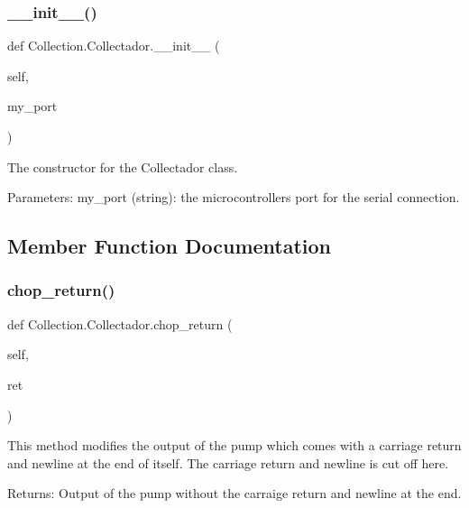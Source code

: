 \subsubsection{\texorpdfstring{\_\_init\_\_()}{\_\_init\_\_()}}
{\footnotesize\ttfamily def Collection.\+Collectador.\+\_\+\+\_\+init\+\_\+\+\_\+ (\begin{DoxyParamCaption}\item[{}]{self,  }\item[{}]{my\+\_\+port }\end{DoxyParamCaption})}

\begin{DoxyVerb}The constructor for the Collectador class.

Parameters:
    my_port (string): the microcontrollers port for the serial connection.
\end{DoxyVerb}
 

\subsection{Member Function Documentation}
\mbox{\label{class_collection_1_1_collectador_a1fcc60319735e3e18d938c84073aef20}} 
\subsubsection{\texorpdfstring{chop\_return()}{chop\_return()}}
{\footnotesize\ttfamily def Collection.\+Collectador.\+chop\+\_\+return (\begin{DoxyParamCaption}\item[{}]{self,  }\item[{}]{ret }\end{DoxyParamCaption})}

\begin{DoxyVerb}This method modifies the output of the pump which comes with a carriage return and newline at the end of itself.
The carriage return and newline is cut off here.

Returns:
    Output of the pump without the carraige return and newline at the end.
\end{DoxyVerb}
 \mbox{\label{class_collection_1_1_collectador_a4e3a010e6084283e311c019de7f7cc5b}} 
